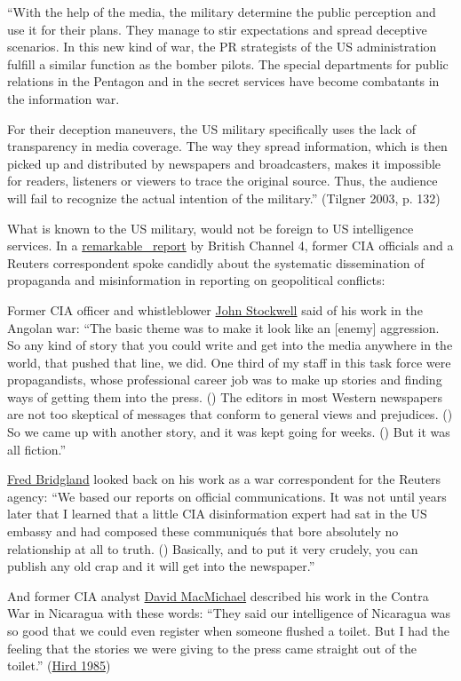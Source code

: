 ``With the help of the media, the military determine the public
perception and use it for their plans. They manage to stir expectations
and spread deceptive scenarios. In this new kind of war, the PR
strategists of the US administration fulfill a similar function as the
bomber pilots. The special departments for public relations in the
Pentagon and in the secret services have become combatants in the
information war.

For their deception maneuvers, the US military specifically uses the
lack of transparency in media coverage. The way they spread information,
which is then picked up and distributed by newspapers and broadcasters,
makes it impossible for readers, listeners or viewers to trace the
original source. Thus, the audience will fail to recognize the actual
intention of the military.'' (Tilgner 2003, p. 132)

What is known to the US military, would not be foreign to US
intelligence services. In a
\href{https://swprs.org/video-the-cia-and-the-media/}{remarkable~
report} by British Channel 4, former CIA officials and a Reuters
correspondent spoke candidly about the systematic dissemination of
propaganda and misinformation in reporting on geopolitical conflicts:

Former CIA officer and whistleblower
\href{https://en.wikipedia.org/wiki/John_Stockwell}{John Stockwell} said
of his work in the Angolan war: ``The basic theme was to make it look
like an {[}enemy{]} aggression. So any kind of story that you could
write and get into the media anywhere in the world, that pushed that
line, we did. One third of my staff in this task force were
propagandists, whose professional career job was to make up stories and
finding ways of getting them into the press. () The editors in most
Western newspapers are not too skeptical of messages that conform to
general views and prejudices. () So we came up with another story, and
it was kept going for weeks. () But it was all fiction.''

\href{https://en.wikipedia.org/wiki/Fred_Bridgland}{Fred Bridgland}
looked back on his work as a war correspondent for the Reuters agency:
``We based our reports on official communications. It was not until
years later that I learned that a little CIA disinformation expert had
sat in the US embassy and had composed these communiqués that bore
absolutely no relationship at all to truth. () Basically, and to put it
very crudely, you can publish any old crap and it will get into the
newspaper.''

And former CIA analyst
\href{https://en.wikipedia.org/wiki/David_MacMichael}{David MacMichael}
described his work in the Contra War in Nicaragua with these words:
``They said our intelligence of Nicaragua was so good that we could even
register when someone flushed a toilet. But I had the feeling that the
stories we were giving to the press came straight out of the toilet.''
(\href{https://swprs.org/video-the-cia-and-the-media/}{Hird 1985})

